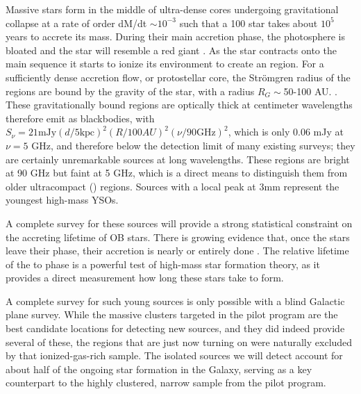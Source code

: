 \documentclass[11pt,preprint]{aastex_nofoot}
\begin{document}
Massive stars form in the middle of ultra-dense cores undergoing gravitational
collapse at a rate of order dM/dt $\sim 10^{-3}$ \msun \peryr such that a 100
\msun star takes about $10^5$ years to accrete its mass.  During their main
accretion phase, the photosphere is bloated and the star will resemble a
red giant \citep{Yorke2002a,Hosokawa2009a}.    As the star contracts onto the
main sequence it starts to ionize its environment to create an \hchii region.
For a sufficiently dense accretion flow, or protostellar core, the Strömgren
radius of the \hchii regions are bound by the gravity of the star, with a
radius $R_G \sim$50-100 AU. \citep{Keto2002a,Keto2003a,Keto2007a}.  These
gravitationally bound \hchii regions are optically thick at centimeter
wavelengths therefore emit as blackbodies, with $S_\nu=21 \textrm{mJy} (d/5
\textrm{kpc})^2 (R/100 AU)^2(\nu/90 \textrm{GHz})^2$, which is only 0.06 mJy at
$\nu=5$ GHz, and therefore below the detection limit of many existing surveys;
they are certainly unremarkable sources at long wavelengths.
These \hchii regions are bright at 90 GHz but faint at 5 GHz, which is a
direct means to distinguish them from older ultracompact (\uchii) regions.
Sources with a local peak at 3mm represent the youngest high-mass YSOs.

A complete survey for these sources will provide a strong statistical
constraint on the accreting lifetime of OB stars.  There is growing evidence
that, once the stars leave their \hchii phase, their accretion is nearly or
entirely done \citep[e.g.,][]{Goddi2018a}.  The relative lifetime of the \hchii
to \uchii phase is a powerful test of high-mass star formation theory, as it
provides a direct measurement how long these stars take to form.

A complete survey for such young sources is only possible with a blind
Galactic plane survey.  While the massive clusters targeted in the pilot
program are the best candidate locations for detecting new sources, and
they did indeed provide several of these, the regions that are just now
turning on were naturally excluded by that ionized-gas-rich sample.
The isolated sources we will detect account for about half of the ongoing
star formation in the Galaxy, serving as a key counterpart to the 
highly clustered, narrow sample from the pilot program.
\end{document}
